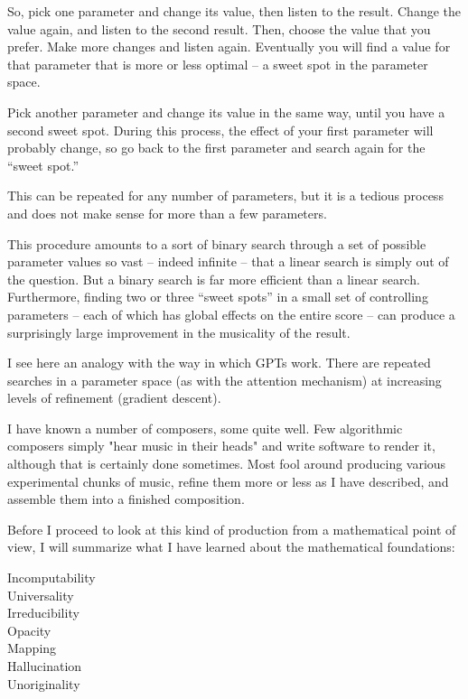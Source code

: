 \documentclass[11pt]{amsart}
\begin{document}
So, pick one parameter and change its value, then listen to the result. Change the value again, and listen to the second result. Then, choose the value that you prefer. Make more changes and listen again. Eventually you will find a value for that parameter that is more or less optimal – a sweet spot in the parameter space.

Pick another parameter and change its value in the same way, until you have a second sweet spot. During this process, the effect of your first parameter will probably change, so go back to the first parameter and search again for the “sweet spot.”

This can be repeated for any number of parameters, but it is a tedious process and does not make sense for more than a few parameters.

This procedure amounts to a sort of binary search through a set of possible parameter values so vast – indeed infinite – that a linear search is simply out of the question. But a binary search is far more efficient than a linear search. Furthermore, finding two or three “sweet spots” in a small set of controlling parameters – each of which has global effects on the entire score – can produce a surprisingly large improvement in the musicality of the result.

I see here an analogy with the way in which GPTs work. There are repeated searches in a parameter space (as with the attention mechanism) at increasing levels of refinement (gradient descent).

I have known a number of composers, some quite well. Few algorithmic composers simply "hear music in their heads" and write software to render it, although that is certainly done sometimes. Most fool around producing various experimental chunks of music, refine them more or less as I have described, and assemble them into a finished composition.

Before I proceed to look at this kind of production from a mathematical point of view, I will summarize what I have learned about the mathematical foundations:

\begin{description}
\item[Incomputability] 
\item[Universality]
\item[Irreducibility] 
\item[Opacity]
\item[Mapping]
\item[Hallucination]
\item[Unoriginality]
\end{description}
\end{document}
